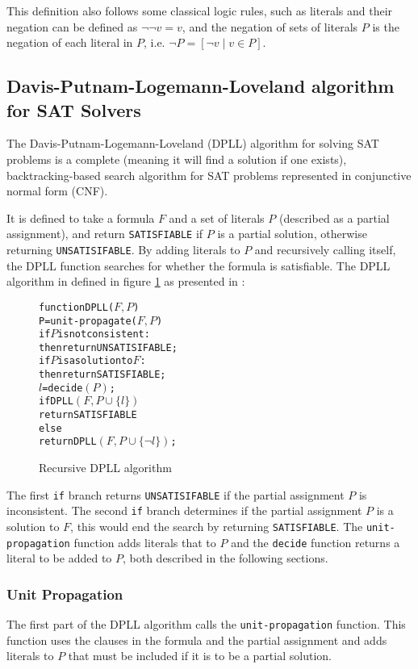 This definition also follows some classical logic rules, such as literals and their negation can be defined as $\neg \neg v = v$,
and the negation of sets of literals $P$ is the negation of each literal in $P$, i.e. $\neg P = [\neg v \mid v \in P]$.

\subsection{Davis-Putnam-Logemann-Loveland algorithm for SAT Solvers}
The Davis-Putnam-Logemann-Loveland (DPLL) algorithm \citep{Davis1960, davis1962machine} for solving SAT problems is a complete (meaning it will find a solution if one exists), 
backtracking-based search algorithm for SAT problems represented in conjunctive normal form (CNF).

It is defined to take a formula $F$ and a set of literals $P$ (described as a partial assignment), and return \verb+SATISFIABLE+ if $P$ is a partial solution, 
otherwise returning \verb+UNSATISIFABLE+.
By adding literals to $P$ and recursively  calling itself, the DPLL function searches for whether the formula is satisfiable.
The DPLL algorithm in defined in figure \ref{impl.DPLL} as presented in \cite{dixon2004automating}:
\begin{figure}[h]
\begin{center}
\begin{alltt}
function DPLL(\(F, P\))
   P = unit-propagate(\(F, P\))
   if \(P\) is not consistent:
       then return UNSATISIFABLE;
   if \(P\) is a solution to \(F\):
       then return SATISFIABLE;
   \(l\) = decide\((P)\);
   if DPLL\((F, P \cup \{l\})\)
       return SATISFIABLE
   else
       return DPLL\((F, P \cup \{\neg l\})\);
\end{alltt}
  \caption{Recursive DPLL algorithm}
  \label{impl.DPLL}
\end{center}
\end{figure}

The first \verb+if+ branch returns \verb+UNSATISIFABLE+ if the partial assignment $P$ is inconsistent.
The second \verb+if+ branch determines if the partial assignment $P$ is a solution to $F$, this would end the search by returning \verb+SATISFIABLE+.
The \verb+unit-propagation+ function adds literals that to $P$ and the \verb+decide+ function returns a literal to be added to $P$, both described in the following sections. 

\subsubsection{Unit Propagation}
The first part of the DPLL algorithm calls the \verb+unit-propagation+ function.
This function uses the clauses in the formula and the partial assignment and adds literals to $P$ that must be included if it is to be a partial solution.

